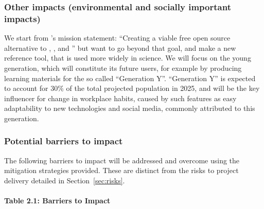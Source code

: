 \subsubsection{Other impacts (environmental and socially important impacts)}


We start from \Sage's mission statement: ``Creating a viable free open
source alternative to \Magma, \Maple, \Mathematica and \Matlab'' but
want to go beyond that goal, and make \TheProject a new reference
tool, that is used more widely in science. We will focus on the young
generation, which will constitute its future users, for example by
producing learning materials for the so called ``Generation
Y''. ``Generation Y'' is expected to account for 30\% of the total
projected population in 2025, and will be the key influencer for
change in workplace habits, caused by such features as easy
adaptability to new technologies and social media, commonly attributed
to this generation.  


\subsubsection{Potential barriers to impact}

The following barriers to impact will be addressed and overcome using the mitigation
strategies provided. These are distinct from the risks to project delivery
detailed in Section~\ref{sec:risks}.
\paragraph{Table 2.1: Barriers to Impact}

\ \\

